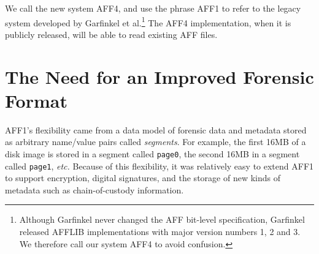 \documentclass[10pt, conference]{IEEEtran}
\begin{document}
We call the new system AFF4, and use the phrase AFF1 to refer to the
legacy system developed by Garfinkel et al.\footnote{Although Garfinkel
never changed the AFF bit-level specification, Garfinkel released
AFFLIB implementations with major version numbers 1, 2 and 3. We
therefore call our system AFF4 to avoid confusion.} The AFF4
implementation, when it is publicly released, will be able to read
existing AFF files.





\section{The Need for an Improved Forensic Format}

AFF1's flexibility came from a data model of forensic data and metadata
stored as arbitrary name/value pairs called \emph{segments}. For
example, the first 16MB of a disk image is stored in a segment called
\texttt{page0}, the second 16MB in a segment called \texttt{page1},
\emph{etc.} Because of this flexibility, it was relatively easy 
to extend AFF1 to support encryption, digital signatures, and the
storage of new kinds of metadata such as chain-of-custody
information\cite{garfinkel:affcrypto}.
\end{document}
